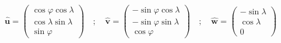 \begin{equation}
\label{eq:vetores_unitarios}
\displaystyle \mathbf{\hat{u}} = 
\left(\begin{array}{c}
\cos{\varphi} \cos{\lambda} \\ \cos{\lambda} \sin{\lambda}\\  \sin{\varphi}
\end{array} \right)  \quad ; \quad
\mathbf{\hat{v}} =
\left(\begin{array}{c}
-\sin{\varphi} \cos{\lambda} \\ -\sin{\varphi} \sin{\lambda} \\ \cos{\varphi}
\end{array} \right)  \quad ; \quad
\mathbf{\hat{w}} =
\left(\begin{array}{c}
-\sin{\lambda} \\ \cos{\lambda} \\ 0
\end{array} \right)
\end{equation} 

